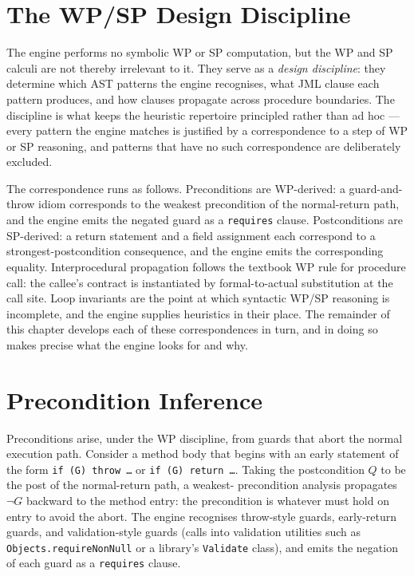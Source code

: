 \section{The WP/SP Design Discipline}
\label{sec:inf-discipline}

The engine performs no symbolic WP or SP computation, but the WP and SP
calculi are not thereby irrelevant to it. They serve as a \emph{design
discipline}: they determine which AST patterns the engine recognises, what JML
clause each pattern produces, and how clauses propagate across procedure
boundaries. The discipline is what keeps the heuristic repertoire principled
rather than ad hoc --- every pattern the engine matches is justified by a
correspondence to a step of WP or SP reasoning, and patterns that have no such
correspondence are deliberately excluded.

The correspondence runs as follows. Preconditions are WP-derived: a
guard-and-throw idiom corresponds to the weakest precondition of the
normal-return path, and the engine emits the negated guard as a
\texttt{requires} clause. Postconditions are SP-derived: a return statement and
a field assignment each correspond to a strongest-postcondition consequence,
and the engine emits the corresponding equality. Interprocedural propagation
follows the textbook WP rule for procedure call: the callee's contract is
instantiated by formal-to-actual substitution at the call site. Loop invariants
are the point at which syntactic WP/SP reasoning is incomplete, and the engine
supplies heuristics in their place. The remainder of this chapter develops each
of these correspondences in turn, and in doing so makes precise what the engine
looks for and why.

\section{Precondition Inference}
\label{sec:inf-pre}

Preconditions arise, under the WP discipline, from guards that abort the normal
execution path. Consider a method body that begins with an early statement of
the form \texttt{if (G) throw \dots} or \texttt{if (G) return \dots}. Taking
the postcondition $Q$ to be the post of the normal-return path, a weakest-
precondition analysis propagates $\neg G$ backward to the method entry: the
precondition is whatever must hold on entry to avoid the abort. The engine
recognises throw-style guards, early-return guards, and validation-style
guards (calls into validation utilities such as \texttt{Objects.requireNonNull}
or a library's \texttt{Validate} class), and emits the negation of each guard
as a \texttt{requires} clause.

